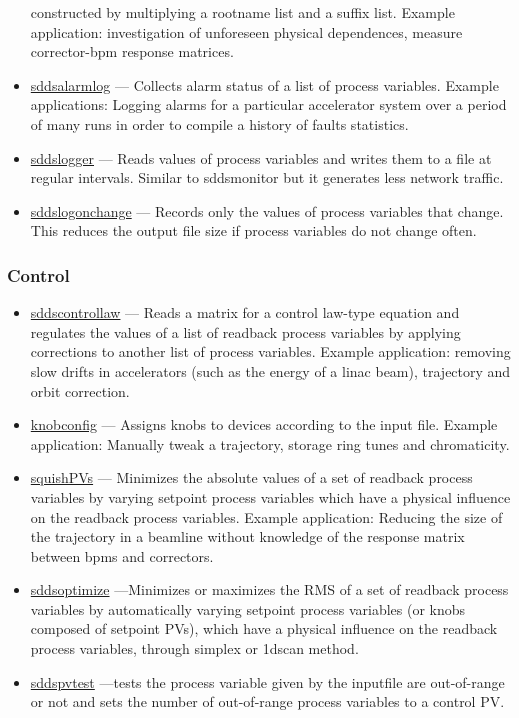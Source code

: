 \documentclass[11pt]{article}
\newcommand{\progref}[1]{\hyperref{#1}{{\tt #1} (}{)}{#1}}
\begin{document}
\begin{itemize}
        constructed by multiplying a rootname list and a suffix list.  Example
        application: investigation of unforeseen physical dependences, measure
        corrector-bpm response matrices.
\item \progref{sddsalarmlog} --- Collects alarm status of a list of process variables.
        Example applications: Logging alarms for a particular accelerator system over a period of
        many runs in order to compile a history of faults statistics.
\item \progref{sddslogger} --- Reads values of process variables and writes them to a file at regular intervals. Similar to sddsmonitor but it generates less network traffic.
\item \progref{sddslogonchange} --- Records only the values of process variables that change. This reduces the output file size if process variables do not change often.
\end{itemize}

\subsubsection{Control}
\begin{itemize}
\item \progref{sddscontrollaw} --- Reads a matrix for a control law-type equation and regulates the
values of a list of readback process variables by applying corrections to another list of process variables. 
        Example application: removing slow drifts in accelerators (such as the energy of a linac beam), trajectory
        and orbit correction.
\item \progref{knobconfig} --- Assigns knobs to devices according to the input file.
        Example application: Manually tweak a trajectory, storage ring tunes and chromaticity.
\item \progref{squishPVs} --- Minimizes the absolute values of a set of readback process variables 
        by varying setpoint process variables which have a physical influence on the readback process variables.
        Example application: Reducing the size of the trajectory in a beamline without knowledge of the
        response matrix between bpms and correctors.
\item \progref{sddsoptimize} ---Minimizes or maximizes the RMS of a set of readback process variables by automatically varying setpoint process variables (or knobs composed of setpoint PVs), which have a physical influence on the readback process variables, through simplex or 1dscan method.
\item \progref{sddspvtest} ---tests the process variable given by the inputfile are out-of-range or not and sets the number of out-of-range process variables to a control PV.
\end{itemize}
\end{document}
